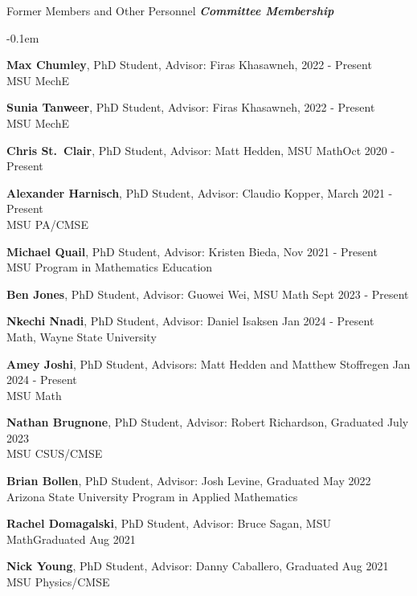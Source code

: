 \documentclass{resume} %
\begin{document}
\begin{rSection}{Former Members and Other Personnel}
\textbf{\textit{Committee Membership}}
\begin{list}{}{\leftmargin=1em}
   \itemsep -0.1em %






   \item \textbf{Max Chumley}, PhD Student, Advisor: Firas Khasawneh, \hfill  2022 - Present\\
   \phantom{xxx}MSU MechE
   \item \textbf{Sunia Tanweer}, PhD Student, Advisor: Firas Khasawneh, \hfill  2022 - Present\\
   \phantom{xxx}MSU MechE
   \item \textbf{Chris St.~Clair}, PhD Student, Advisor: Matt Hedden, MSU Math\hfill Oct 2020 - Present
   \item \textbf{Alexander Harnisch}, PhD Student, Advisor: Claudio Kopper, \hfill March 2021 - Present\\
   \phantom{xxx} MSU PA/CMSE
   \item \textbf{Michael Quail}, PhD Student, Advisor: Kristen Bieda, \hfill Nov 2021 - Present\\
   \phantom{xxx} MSU Program in Mathematics Education
   \item \textbf{Ben Jones}, PhD Student, Advisor: Guowei Wei, MSU Math \hfill Sept 2023 - Present
   \item \textbf{Nkechi Nnadi}, PhD Student, Advisor: Daniel Isaksen \hfill Jan 2024 - Present\\
   \phantom{xxx}Math, Wayne State University 
   \item \textbf{Amey Joshi}, PhD Student, Advisors: Matt Hedden and Matthew Stoffregen \hfill Jan 2024 - Present\\
   \phantom{xxx}MSU Math
   \item \textbf{Nathan Brugnone}, PhD Student, Advisor: Robert Richardson, \hfill  Graduated July 2023\\
   \phantom{xxx}MSU CSUS/CMSE 
    \item \textbf{Brian Bollen}, PhD Student, Advisor: Josh Levine, \hfill Graduated May 2022\\
    \phantom{xxx}Arizona State University Program in Applied Mathematics
   \item \textbf{Rachel Domagalski}, PhD Student, Advisor: Bruce Sagan, MSU Math\hfill Graduated Aug 2021
   \item \textbf{Nick Young}, PhD Student, Advisor: Danny Caballero, \hfill Graduated Aug 2021\\
   \phantom{xxx}MSU Physics/CMSE


\end{list}
\end{rSection}
\end{document}
